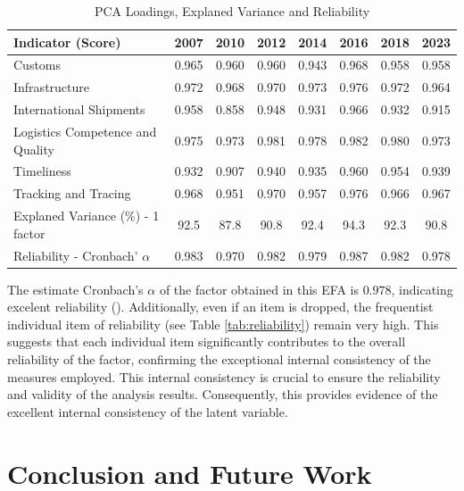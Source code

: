 \documentclass[sigconf]{acmart}
\begin{document}
\begin{table}[h]
  \caption{PCA Loadings, Explaned Variance and Reliability}
  \label{tab:loadings}
\begin{tabular}{lccccccc}
\toprule
\textbf{Indicator (Score)}	&	\textbf{2007}	&	\textbf{2010}	&	\textbf{2012}	&	\textbf{2014}	&	\textbf{2016}	&	\textbf{2018}	&	\textbf{2023}	\\  
\midrule
Customs	&	0.965	&	0.960	&	0.960	&	0.943	&	0.968	&	0.958	&	0.958	\\	
Infrastructure	&	0.972	&	0.968	&	0.970	&	0.973	&	0.976	&	0.972	&	0.964	\\	
International Shipments	&	0.958	&	0.858	&	0.948	&	0.931	&	0.966	&	0.932	&	0.915	\\	
Logistics Competence and Quality	&	0.975	&	0.973	&	0.981	&	0.978	&	0.982	&	0.980	&	0.973	\\	
Timeliness	&	0.932	&	0.907	&	0.940	&	0.935	&	0.960	&	0.954	&	0.939	\\	
Tracking and Tracing	&	0.968	&	0.951	&	0.970	&	0.957	&	0.976	&	0.966	&	0.967	\\	\midrule
Explaned Variance (\%) - 1 factor 	&	92.5	&	87.8	&	90.8	&	92.4	&	94.3	&	92.3	&	90.8	\\	\midrule
Reliability - Cronbach' $\alpha$	&	0.983	&	0.970	&	0.982	&	0.979	&	0.987	&	0.982	&	0.978	\\	\bottomrule
\end{tabular}
\end{table}

The estimate Cronbach's $\alpha$ of the factor obtained in this EFA is $0.978$, indicating excelent reliability (\cite{pestana2008analise}). Additionally, even if an item is dropped, the frequentist individual item of reliability (see Table \ref{tab:reliability}) remain very high. This suggests that each individual item significantly contributes to the overall reliability of the factor, confirming the exceptional internal consistency of the measures employed. This internal consistency is crucial to ensure the reliability and validity of the analysis results. 
Consequently, this provides evidence of the excellent internal consistency of the latent variable.


\section{Conclusion and Future Work}
\end{document}
